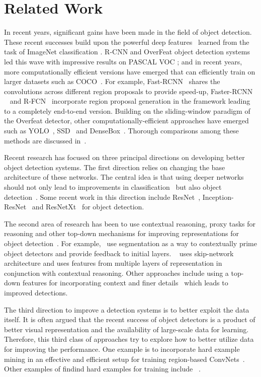 \section{Related Work}
In recent years, significant gains have been made in the field of object detection. These recent successes build upon the powerful deep features~\cite{alex} learned from the task of ImageNet classification \cite{imagenet}. R-CNN \cite{rcnn} and OverFeat \cite{overfeat} object detection systems led this wave with impressive results on PASCAL VOC \cite{voc}; and in recent years, more computationally efficient versions have emerged that can efficiently train on larger datasets such as COCO~\cite{coco}. For example, Fast-RCNN~\cite{frcn} shares the convolutions across different region proposals to provide speed-up, Faster-RCNN ~\cite{renNIPS15fasterrcnn} and R-FCN~\cite{dai16rfcn} incorporate region proposal generation in the framework leading to a completely end-to-end version. Building on the sliding-window paradigm of the Overfeat detector, other computationally-efficient approaches have emerged such as YOLO~\cite{yolo16}, SSD~\cite{ssd16} and DenseBox~\cite{densebox}. Thorough comparisons among these methods are discussed in~\cite{Jonathan16}. 


Recent research has focused on three principal directions on developing better object detection systems.
The first direction relies on changing the base architecture of these networks. The central idea is that using deeper networks should not only lead to improvements in classification~\cite{imagenet} but also object detection~\cite{voc,coco}. Some recent work in this direction include ResNet~\cite{resnet},  Inception-ResNet~\cite{inceptionresnet} and ResNetXt~\cite{Xie2016} for object detection.

The second area of research has been to use contextual reasoning, proxy tasks for reasoning and other top-down mechanisms for improving representations for object detection~\cite{ion,DeepMask,TDM17,FPN17,shrivastava16,Gidaris15,Zengeccv16}. For example,~\cite{shrivastava16} use segmentation as a way to contextually prime object detectors and provide feedback to initial layers. ~\cite{ion} uses skip-network architecture and uses features from multiple layers of representation in conjunction with contextual reasoning. Other approaches include using a top-down features for incorporating context and finer details~\cite{DeepMask,TDM17,FPN17} which leads to improved detections.

The third direction to improve a detection systems is to better exploit the data itself. It is often argued that the recent success of object detectors is a product of better visual representation and the availability of large-scale data for learning. Therefore, this third class of approaches try to explore how to better utilize data for improving the performance. One example is to incorporate hard example mining in an effective and efficient setup for training region-based ConvNets~\cite{shrivastavaOHEM}. Other examples of findind hard examples for training include ~\cite{simo2014fracking,wang2015unsupervised,loshchilov2015online}.

